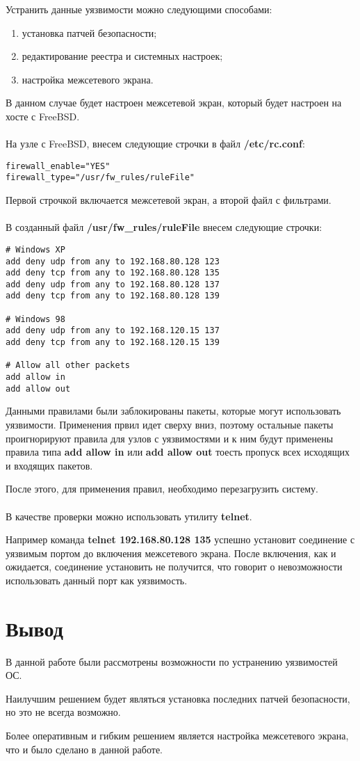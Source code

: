 \documentclass[a4paper, 12pt]{article}		%
\begin{document}
Устранить данные уязвимости можно следующими способами:
\begin{enumerate}
\item установка патчей безопасности;
\item редактирование реестра и системных настроек;
\item настройка межсетевого экрана.
\end{enumerate}
В данном случае будет настроен межсетевой экран, который будет настроен на хосте с FreeBSD.\\\\
На узле с FreeBSD, внесем следующие строчки в файл \textbf{/etc/rc.conf}:
\begin{lstlisting}[language={}]
firewall_enable="YES"
firewall_type="/usr/fw_rules/ruleFile"
\end{lstlisting}
Первой строчкой включается межсетевой экран, а второй файл с фильтрами.\\\\
В созданный файл \textbf{/usr/fw\_rules/ruleFile} внесем следующие строчки:
\begin{lstlisting}[language={}]
# Windows XP
add deny udp from any to 192.168.80.128 123
add deny tcp from any to 192.168.80.128 135
add deny udp from any to 192.168.80.128 137
add deny tcp from any to 192.168.80.128 139

# Windows 98
add deny udp from any to 192.168.120.15 137
add deny tcp from any to 192.168.120.15 139

# Allow all other packets
add allow in
add allow out
\end{lstlisting}
Данными правилами были заблокированы пакеты, которые могут использовать уязвимости. Применения првил идет сверху вниз, поэтому остальные пакеты проигнорируют правила для узлов с уязвимостями и к ним будут применены правила типа \textbf{add allow in} или \textbf{add allow out} тоесть пропуск всех исходящих и входящих пакетов.

После этого, для применения правил, необходимо перезагрузить систему.\\\\
В качестве проверки можно использовать утилиту \textbf{telnet}. 

Например команда \textbf{telnet 192.168.80.128 135} успешно установит соединение с уязвимым портом до включения межсетевого экрана. После включения, как и ожидается, соединение установить не получится, что говорит о невозможности использовать данный порт как уязвимость.

\section*{Вывод}
В данной работе были рассмотрены возможности по устранению уязвимостей ОС.

Наилучшим решением будет являться установка последних патчей безопасности, но это не всегда возможно. 

Более оперативным и гибким решением является настройка межсетевого экрана, что и было сделано в данной работе.

%
%
\end{document}
